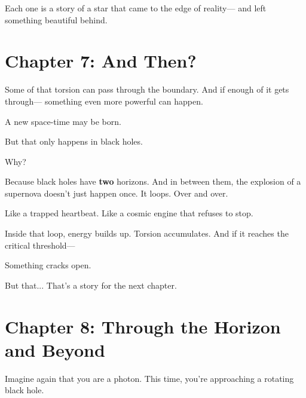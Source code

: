 \documentclass{article}
\begin{document}
\vspace{1ex}
\noindent
Each one is a story of a star that came to the edge of reality—  
and left something beautiful behind.




\section*{Chapter 7: And Then?}

\noindent
Some of that torsion can pass through the boundary.  
And if enough of it gets through—  
something even more powerful can happen.

\vspace{1ex}
\noindent
A new space-time may be born.

\vspace{1ex}
\noindent
But that only happens in black holes.

\vspace{1ex}
\noindent
Why?

\vspace{1ex}
\noindent
Because black holes have \textbf{two} horizons.  
And in between them, the explosion of a supernova doesn’t just happen once.  
It loops.  
Over and over.

\vspace{1ex}
\noindent
Like a trapped heartbeat.  
Like a cosmic engine that refuses to stop.

\vspace{1ex}
\noindent
Inside that loop, energy builds up.  
Torsion accumulates.  
And if it reaches the critical threshold—

\vspace{1ex}
\noindent
Something cracks open.

\vspace{1ex}
\noindent
But that...  
That’s a story for the next chapter.




\section*{Chapter 8: Through the Horizon and Beyond}

\noindent
Imagine again that you are a photon.  
This time, you’re approaching a rotating black hole.
\end{document}
